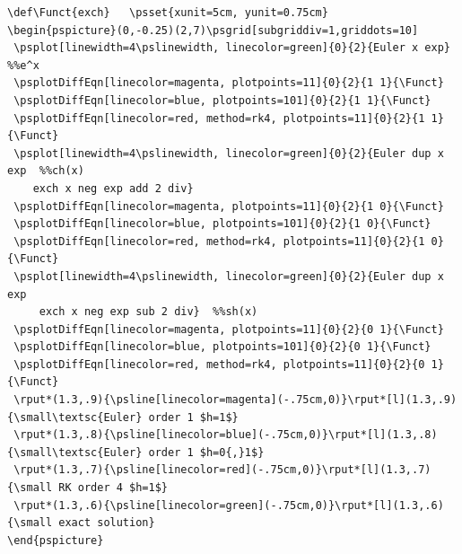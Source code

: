 \documentclass[11pt,english,BCOR=10mm,DIV=12,bibliography=totoc,parskip=false,headings=small,
    headinclude=false,footinclude=false,oneside]{pst-doc}
\begin{document}
\begin{lstlisting}[label={fig:minusexp},xrightmargin=-1.5cm]
\def\Funct{exch}   \psset{xunit=5cm, yunit=0.75cm}
\begin{pspicture}(0,-0.25)(2,7)\psgrid[subgriddiv=1,griddots=10]
 \psplot[linewidth=4\pslinewidth, linecolor=green]{0}{2}{Euler x exp}  %%e^x
 \psplotDiffEqn[linecolor=magenta, plotpoints=11]{0}{2}{1 1}{\Funct}
 \psplotDiffEqn[linecolor=blue, plotpoints=101]{0}{2}{1 1}{\Funct}
 \psplotDiffEqn[linecolor=red, method=rk4, plotpoints=11]{0}{2}{1 1}{\Funct}
 \psplot[linewidth=4\pslinewidth, linecolor=green]{0}{2}{Euler dup x exp  %%ch(x)
    exch x neg exp add 2 div}
 \psplotDiffEqn[linecolor=magenta, plotpoints=11]{0}{2}{1 0}{\Funct}
 \psplotDiffEqn[linecolor=blue, plotpoints=101]{0}{2}{1 0}{\Funct}
 \psplotDiffEqn[linecolor=red, method=rk4, plotpoints=11]{0}{2}{1 0}{\Funct}
 \psplot[linewidth=4\pslinewidth, linecolor=green]{0}{2}{Euler dup x exp
     exch x neg exp sub 2 div}  %%sh(x)
 \psplotDiffEqn[linecolor=magenta, plotpoints=11]{0}{2}{0 1}{\Funct}
 \psplotDiffEqn[linecolor=blue, plotpoints=101]{0}{2}{0 1}{\Funct}
 \psplotDiffEqn[linecolor=red, method=rk4, plotpoints=11]{0}{2}{0 1}{\Funct}
 \rput*(1.3,.9){\psline[linecolor=magenta](-.75cm,0)}\rput*[l](1.3,.9){\small\textsc{Euler} order 1 $h=1$}
 \rput*(1.3,.8){\psline[linecolor=blue](-.75cm,0)}\rput*[l](1.3,.8){\small\textsc{Euler} order 1 $h=0{,}1$}
 \rput*(1.3,.7){\psline[linecolor=red](-.75cm,0)}\rput*[l](1.3,.7){\small RK order 4 $h=1$}
 \rput*(1.3,.6){\psline[linecolor=green](-.75cm,0)}\rput*[l](1.3,.6){\small exact solution}
\end{pspicture}
\end{lstlisting}

\clearpage
\end{document}
